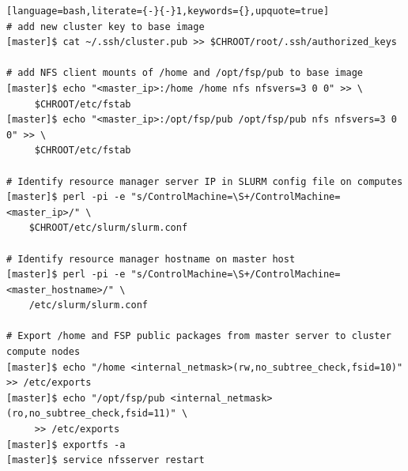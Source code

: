 \documentclass[letterpaper]{article}
\begin{document}
\begin{lstlisting}[language=bash,literate={-}{-}1,keywords={},upquote=true]
# add new cluster key to base image
[master]$ cat ~/.ssh/cluster.pub >> $CHROOT/root/.ssh/authorized_keys

# add NFS client mounts of /home and /opt/fsp/pub to base image
[master]$ echo "<master_ip>:/home /home nfs nfsvers=3 0 0" >> \
     $CHROOT/etc/fstab
[master]$ echo "<master_ip>:/opt/fsp/pub /opt/fsp/pub nfs nfsvers=3 0 0" >> \
     $CHROOT/etc/fstab

# Identify resource manager server IP in SLURM config file on computes
[master]$ perl -pi -e "s/ControlMachine=\S+/ControlMachine=<master_ip>/" \
    $CHROOT/etc/slurm/slurm.conf

# Identify resource manager hostname on master host
[master]$ perl -pi -e "s/ControlMachine=\S+/ControlMachine=<master_hostname>/" \
    /etc/slurm/slurm.conf

# Export /home and FSP public packages from master server to cluster compute nodes
[master]$ echo "/home <internal_netmask>(rw,no_subtree_check,fsid=10)" >> /etc/exports
[master]$ echo "/opt/fsp/pub <internal_netmask>(ro,no_subtree_check,fsid=11)" \
     >> /etc/exports
[master]$ exportfs -a
[master]$ service nfsserver restart
\end{lstlisting}
\end{document}
